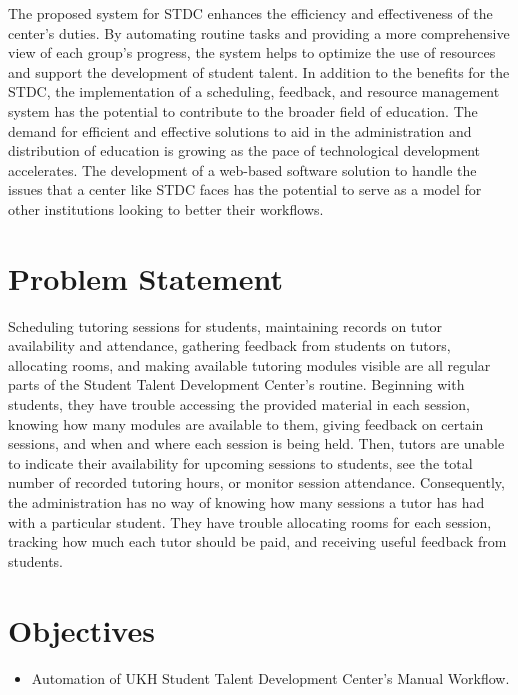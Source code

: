 \begin{justify}
\vspace{0.25cm}
\newendline The proposed system for STDC enhances the efficiency and effectiveness of the center’s duties. By automating routine tasks and providing a more comprehensive view of each group's progress, the system helps to optimize the use of resources and support the development of student talent.
\vspace{0.25cm}
\newendline In addition to the benefits for the STDC, the implementation of a scheduling, feedback, and resource management system has the potential to contribute to the broader field of education. The demand for efficient and effective solutions to aid in the administration and distribution of education is growing as the pace of technological development accelerates. The development of a web-based software solution to handle the issues that a center like STDC faces has the potential to serve as a model for other institutions looking to better their workflows.\\
\end{justify}

\section{Problem Statement}
\begin{justify}
Scheduling tutoring sessions for students, maintaining records on tutor availability and attendance, gathering feedback from students on tutors, allocating rooms, and making available tutoring modules visible are all regular parts of the Student Talent Development Center's routine. Beginning with students, they have trouble accessing the provided material in each session, knowing how many modules are available to them, giving feedback on certain sessions, and when and where each session is being held. Then, tutors are unable to indicate their availability for upcoming sessions to students, see the total number of recorded tutoring hours, or monitor session attendance. Consequently, the administration has no way of knowing how many sessions a tutor has had with a particular student. They have trouble allocating rooms for each session, tracking how much each tutor should be paid, and receiving useful feedback from students.\\
\end{justify}

\section{Objectives}
\begin{justify}
    \begin{itemize}
        \item Automation of UKH Student Talent Development Center’s Manual Workflow.\\
    \end{itemize}
\end{justify}

